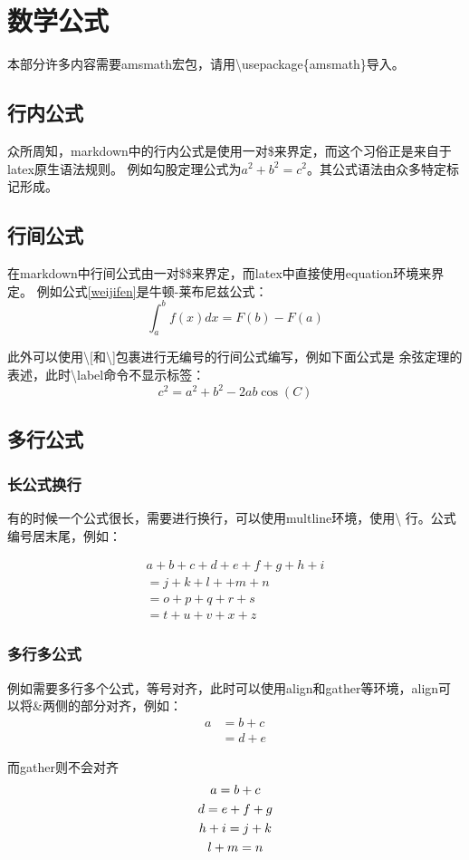 \section{数学公式}
本部分许多内容需要amsmath宏包，请用\textbackslash usepackage\{amsmath\}导入。
\subsection{行内公式}
众所周知，markdown中的行内公式是使用一对\$来界定，而这个习俗正是来自于latex原生语法规则。
例如勾股定理公式为$a^2+b^2=c^2$。其公式语法由众多特定标记形成。

\subsection{行间公式}
在markdown中行间公式由一对\$\$来界定，而latex中直接使用equation环境来界定。
例如公式\ref{weijifen}是牛顿-莱布尼兹公式：
\begin{equation}
    \int_a^bf(x)dx=F(b)-F(a) \label{weijifen}
\end{equation}

此外可以使用\textbackslash [和\textbackslash ]包裹进行无编号的行间公式编写，例如下面公式是
余弦定理的表述，此时\textbackslash label命令不显示标签：
\[c^2=a^2+b^2-2ab\cos (C) \]

\subsection{多行公式}
\subsubsection{长公式换行}
有的时候一个公式很长，需要进行换行，可以使用multline环境，使用\textbackslash{}
行。公式编号居末尾，例如：

\begin{multline}
a + b + c + d + e +f + g + h +i \\
= j + k + l + +m +n \\
= o +p + q + r + s \\
= t + u + v + x + z 
\end{multline}

\subsubsection{多行多公式}
例如需要多行多个公式，等号对齐，此时可以使用align和gather等环境，align可以将\&两侧的部分对齐，例如：
\begin{align}
    a & = b + c \\
    & = d +e
\end{align}

而gather则不会对齐
\begin{gather}
    a = b + c \\
    d = e + f + g \\
    h + i = j + k \notag \\
    l + m = n
\end{gather}
